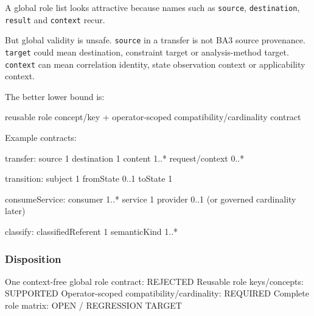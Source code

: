 \documentclass[
  10pt,
  letterpaper,
]{article}
\newenvironment{Shaded}{}{}
\newcommand{\NormalTok}[1]{#1}
\begin{document}
A global role list looks attractive because names such as
\texttt{source}, \texttt{destination}, \texttt{result} and
\texttt{context} recur.

But global validity is unsafe. \texttt{source} in a transfer is not BA3
source provenance. \texttt{target} could mean destination, constraint
target or analysis-method target. \texttt{context} can mean correlation
identity, state observation context or applicability context.

The better lower bound is:

\begin{Shaded}
\begin{Highlighting}[]
\NormalTok{reusable role concept/key}
\NormalTok{        +}
\NormalTok{operator{-}scoped compatibility/cardinality contract}
\end{Highlighting}
\end{Shaded}

Example contracts:

\begin{Shaded}
\begin{Highlighting}[]
\NormalTok{transfer:}
\NormalTok{  source       1}
\NormalTok{  destination  1}
\NormalTok{  content      1..*}
\NormalTok{  request/context 0..*}

\NormalTok{transition:}
\NormalTok{  subject      1}
\NormalTok{  fromState    0..1}
\NormalTok{  toState      1}

\NormalTok{consumeService:}
\NormalTok{  consumer     1..*}
\NormalTok{  service      1}
\NormalTok{  provider     0..1 (or governed cardinality later)}

\NormalTok{classify:}
\NormalTok{  classifiedReferent 1}
\NormalTok{  semanticKind       1..*}
\end{Highlighting}
\end{Shaded}

\subsubsection{Disposition}\label{disposition-3}

\begin{Shaded}
\begin{Highlighting}[]
\NormalTok{One context{-}free global role contract: REJECTED}
\NormalTok{Reusable role keys/concepts: SUPPORTED}
\NormalTok{Operator{-}scoped compatibility/cardinality: REQUIRED}
\NormalTok{Complete role matrix: OPEN / REGRESSION TARGET}
\end{Highlighting}
\end{Shaded}
\end{document}
